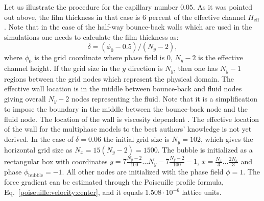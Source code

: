 \documentclass[preprint,12pt]{elsarticle}
\begin{document}
Let us illustrate the procedure for the capillary number
$0.05$. As it was pointed out above, the film thickness in that case is $6$ percent of the
effective
channel $H_{\mathrm{eff}}$.
Note that in the case of the half-way bounce-back walls \cite{yu} which are used in the
simulations one needs to calculate the film thickness as:
\begin{equation}
\delta=(\phi_0-0.5)/(N_y-2),
\end{equation}
where $\phi_0$ is the grid coordinate where phase field is $0$, $N_y-2$
is the effective channel height.
If the grid size in the $y$ direction is $N_y$, then one has $N_y-1$ regions between the grid nodes
which represent
the physical domain. The effective wall location is in the middle between bounce-back and fluid nodes giving
overall $N_y-2$ nodes representing the fluid. Note that it is a simplification to impose the
boundary in the middle between the bounce-back
node and the fluid node. The location of the wall is
viscosity dependent \cite{ginzburg-multireflection}.  The effective location of the
wall for the
multiphase models to the best authors' knowledge is not yet derived. In the case of $\delta=0.06$
the
initial grid size is $N_y=102$, which gives the horizontal grid size as $N_x=15(N_y-2)=1500$.
The bubble is initialized as a rectangular box with coordinates
{\color{red}$y=7\frac{N_y-2}{100}\dots N_y-7\frac{N_y-2}{100}-1$}, $x=\frac{N_x}{3}\dots \frac{2
N_x}{3}$ and phase
$\phi_{\mathrm{bubble}}=-1$. All other nodes are initialized with the phase field
$\phi=1$. The force gradient can be estimated through the Poiseuille
profile formula, Eq.~\ref{poiseuille:velocity:center}, and it equals
$1.508 \cdot 10^{-6}$ lattice units.
\end{document}
